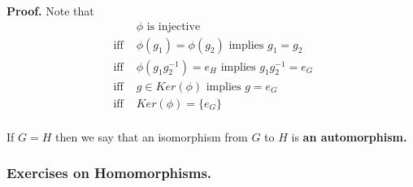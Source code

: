 \documentclass[12pt]{article}
\begin{document}
{\bf Proof.}
Note that
$$\begin{array}{cl}
& \phi \mbox{ is injective }  \\
\mbox{ iff } & \phi(g_1)=\phi(g_2) \mbox{ implies } g_1=g_2\\
\mbox{ iff } &  \phi(g_1g_2^{-1})=e_H \mbox{ implies } g_1g_2^{-1}=e_G
\\
\mbox{ iff } & g\in Ker(\phi) \mbox{ implies } g=e_G \\
\mbox{ iff } & Ker(\phi) = \{e_G\}\\
\end{array}
$$

If $G=H$ then we say that an isomorphism from $G$ to $H$ is  {\bf an
automorphism.}

\subsubsection{Exercises on Homomorphisms.}
\end{document}
